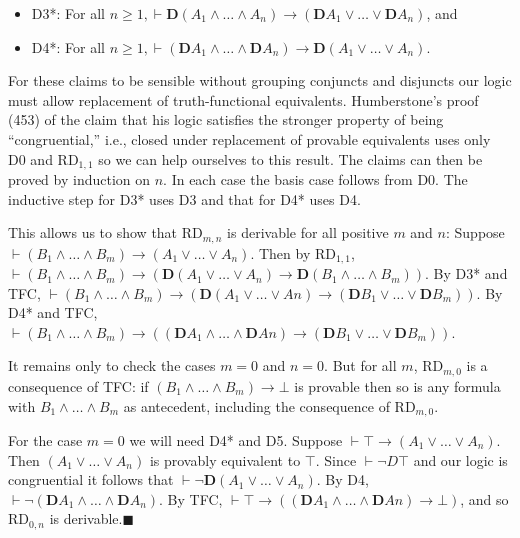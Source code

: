 \documentclass[11pt]{article}
\begin{document}
\begin{itemize}[label={}]
\item{D3*: For all $n{\ge}1, \vdash \mathbf{D}(A_1\wedge {\ldots}\wedge A_n) \rightarrow (\mathbf{D}A_1\vee {\ldots}\vee \mathbf{D}A_n)$, and}
\item{D4*: For all $n{\ge}1, \vdash (\mathbf{D}A_1\wedge {\ldots}\wedge \mathbf{D}A_n) \rightarrow \mathbf{D}(A_1\vee {\ldots}\vee A_n)$.}
\end{itemize}
For these claims to be sensible without grouping conjuncts and disjuncts our logic must allow replacement of truth-functional equivalents. Humberstone's proof (453) of the claim that his logic satisfies the stronger property of being ``congruential,'' i.e., closed under replacement of provable equivalents uses only D0 and RD$_{1,1}$ so we can help ourselves to this result. The claims can then be proved by induction on $n$. In each case the basis case follows from D0. The inductive step for D3* uses D3 and that for D4* uses D4.

This allows us to show that RD$_{m,n}$ is derivable for all positive $m$ and $n$: 
Suppose $\vdash (B_1 \wedge {\ldots}\wedge B_m) \rightarrow (A_1\vee {\ldots}\vee A_n)$. 
Then by RD$_{1,1}$,\\ $\vdash (B_1 \wedge {\ldots}\wedge B_m) \rightarrow (\mathbf{D}(A_1\vee {\ldots}\vee A_n) \rightarrow \mathbf{D}(B_1 \wedge {\ldots}\wedge B_m))$. 
By D3* and TFC, $\vdash (B_1 \wedge {\ldots}\wedge B_m) \rightarrow (\mathbf{D}(A_1\vee {\ldots}\vee An) \rightarrow (\mathbf{D}B_1 \vee {\ldots}\vee \mathbf{D}B_m))$. 
By D4* and TFC, $\vdash (B_1 \wedge {\ldots}\wedge B_m) \rightarrow ((\mathbf{D}A_1\wedge {\ldots}\wedge \mathbf{D}An) \rightarrow (\mathbf{D}B_1 \vee {\ldots}\vee \mathbf{D}B_m))$.


It remains only to check the cases $m{=}0$ and $n{=}0$. But for all $m$, RD$_{m,0}$ is a consequence of TFC: if $(B_1\wedge {\ldots}\wedge B_m)\rightarrow \bot$ is provable then so is any formula with $B_1\wedge {\ldots}\wedge B_m$ as antecedent, including the consequence of RD$_{m,0}$.

For the case $m=0$ we will need D4* and D5. Suppose $\vdash \top \rightarrow (A_1\vee {\ldots}\vee A_n)$. Then $(A_1\vee {\ldots}\vee A_n)$ is provably equivalent to $\top $. Since $\vdash \neg D\top $ and our logic is congruential it follows that
$\vdash \neg \mathbf{D}(A_1\vee {\ldots}\vee A_n)$. By D4, $\vdash \neg (\mathbf{D}A_1\wedge {\ldots}\wedge \mathbf{D}A_n)$. By TFC, $\vdash \top \rightarrow ( (\mathbf{D}A_1\wedge {\ldots}\wedge \mathbf{D}An) \rightarrow \bot)$, and so RD$_{0,n}$ is derivable.$\blacksquare$
\end{document}
